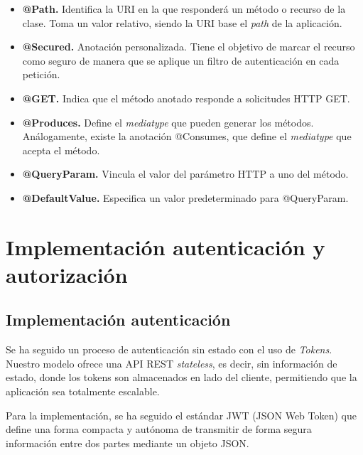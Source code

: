 \begin{itemize}
	\item \textbf{@Path. }Identifica la URI en la que responderá un método o recurso de la clase. Toma un valor relativo, siendo la URI base el \textit{path} de la aplicación.
	\item \textbf{@Secured. }Anotación personalizada. Tiene el objetivo de marcar el recurso como seguro de manera que se aplique un filtro de autenticación en cada petición.
	\item \textbf{@GET. }Indica que el método anotado responde a solicitudes HTTP GET.
	\item \textbf{@Produces. }Define el \textit{mediatype} que pueden generar los métodos. Análogamente, existe la anotación @Consumes, que define el \textit{mediatype} que acepta el método.
	\item \textbf{@QueryParam. }Vincula el valor del parámetro HTTP a uno del método.
	\item \textbf{@DefaultValue. }Especifica un valor predeterminado para @QueryParam.
\end{itemize}


\section{Implementación autenticación y autorización}

\subsection{Implementación autenticación}

Se ha seguido un proceso de autenticación sin estado con el uso de \textit{Tokens}. Nuestro modelo ofrece una API REST \textit{stateless}, es decir, sin información de estado, donde los tokens son almacenados en lado del cliente, permitiendo que la aplicación sea totalmente escalable.

Para la implementación, se ha seguido el estándar JWT (JSON Web Token) que define una forma compacta y autónoma de transmitir de forma segura información entre dos partes mediante un objeto JSON.


